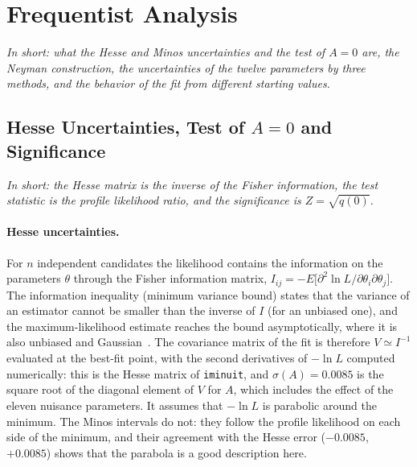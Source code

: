\FloatBarrier

\section{Frequentist Analysis}
\label{app:freq}
\emph{In short: what the Hesse and Minos uncertainties and the test of $A=0$ are, the Neyman construction, the uncertainties of the twelve parameters by three methods, and the behavior of the fit from different starting values.}

\subsection{Hesse Uncertainties, Test of $A=0$ and Significance}
\label{sec:appendix_freq}
\emph{In short: the Hesse matrix is the inverse of the Fisher information, the test statistic is the profile likelihood ratio, and the significance is $Z=\sqrt{q(0)}$.}
\paragraph{Hesse uncertainties.}
For $n$ independent candidates the likelihood contains the information on the parameters $\theta$ through the Fisher information matrix, $I_{ij}=-E\big[\partial^2\ln L/\partial\theta_i\partial\theta_j\big]$. The information inequality (minimum variance bound) states that the variance of an estimator cannot be smaller than the inverse of $I$ (for an unbiased one), and the maximum-likelihood estimate reaches the bound asymptotically, where it is also unbiased and Gaussian~\cite{cowan}. The covariance matrix of the fit is therefore $V\simeq I^{-1}$ evaluated at the best-fit point, with the second derivatives of $-\ln L$ computed numerically: this is the Hesse matrix of \texttt{iminuit}, and $\sigma(A)=0.0085$ is the square root of the diagonal element of $V$ for $A$, which includes the effect of the eleven nuisance parameters. It assumes that $-\ln L$ is parabolic around the minimum. The Minos intervals do not: they follow the profile likelihood on each side of the minimum, and their agreement with the Hesse error ($-0.0085$, $+0.0085$) shows that the parabola is a good description here.

